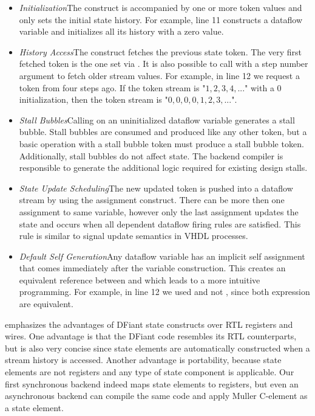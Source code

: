\begin{itemize}[leftmargin=*]
	\item \textit{Initialization}\quad The  construct is accompanied by one or more token values and only sets the initial state history. For example, line 11 constructs a dataflow variable and initializes all its history with a zero value. 
	\item \textit{History Access}\quad The  construct fetches the previous state token. The very first fetched token is the one set via . It is also possible to call  with a step number argument to fetch older stream values. For example, in line 12 we request a  token from four steps ago. If the  token stream is "$1,2,3,4,...$" with a $0$ initialization, then the  token stream is "$0,0,0,0,1,2,3,...$".
	\item \textit{Stall Bubbles}\quad Calling  on an uninitialized dataflow variable generates a stall bubble. Stall bubbles are consumed and produced like any other token, but a basic operation with a stall bubble token must produce a stall bubble token. Additionally, stall bubbles do not affect state. The backend compiler is responsible to generate the additional logic required for existing design stalls. 
	\item \textit{State Update Scheduling}\quad The new updated token is pushed into a dataflow stream by using the \code{:=} assignment construct. There can be more then one assignment to same variable, however only the last assignment updates the state and occurs when all dependent dataflow firing rules are satisfied. This rule is similar to signal update semantics in VHDL processes.
	\item \textit{Default Self Generation}\quad Any dataflow  variable has an implicit self assignment  that comes immediately after the variable construction. This creates an equivalent reference between  and  which leads to a more intuitive programming.
	For example, in line 12 we used  and not , since both expression are equivalent.
\end{itemize} 
\vspace{0.5ex}

 emphasizes the advantages of DFiant state constructs over RTL registers and wires.
One advantage is that the DFiant code resembles its RTL counterparts, but is also very concise since state elements are automatically constructed when a stream history is accessed. Another advantage is portability, because state elements are not registers and any type of state component is applicable. Our first synchronous backend indeed maps state elements to registers, but even an asynchronous backend can compile the same code and apply Muller C-element\cite{muller1957theory} as a state element. 


